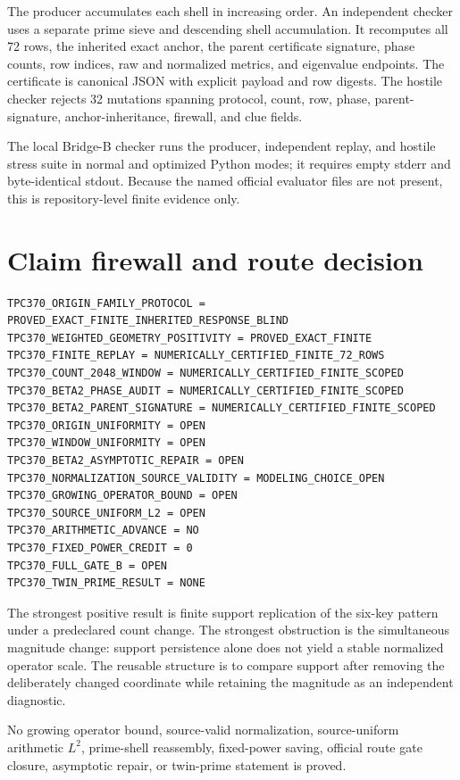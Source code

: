\documentclass[10pt]{article}
\begin{document}
The producer accumulates each shell in increasing order.  An independent
checker uses a separate prime sieve and descending shell accumulation.  It
recomputes all 72 rows, the inherited exact anchor, the parent certificate
signature, phase counts, row indices, raw and normalized metrics, and
eigenvalue endpoints.  The certificate is canonical JSON with explicit
payload and row digests.  The hostile checker rejects 32 mutations spanning
protocol, count, row, phase, parent-signature, anchor-inheritance, firewall,
and clue fields.

The local Bridge-B checker runs the producer, independent replay, and hostile
stress suite in normal and optimized Python modes; it requires empty stderr
and byte-identical stdout.  Because the named official evaluator files are
not present, this is repository-level finite evidence only.

\section{Claim firewall and route decision}

\begin{verbatim}
TPC370_ORIGIN_FAMILY_PROTOCOL = PROVED_EXACT_FINITE_INHERITED_RESPONSE_BLIND
TPC370_WEIGHTED_GEOMETRY_POSITIVITY = PROVED_EXACT_FINITE
TPC370_FINITE_REPLAY = NUMERICALLY_CERTIFIED_FINITE_72_ROWS
TPC370_COUNT_2048_WINDOW = NUMERICALLY_CERTIFIED_FINITE_SCOPED
TPC370_BETA2_PHASE_AUDIT = NUMERICALLY_CERTIFIED_FINITE_SCOPED
TPC370_BETA2_PARENT_SIGNATURE = NUMERICALLY_CERTIFIED_FINITE_SCOPED
TPC370_ORIGIN_UNIFORMITY = OPEN
TPC370_WINDOW_UNIFORMITY = OPEN
TPC370_BETA2_ASYMPTOTIC_REPAIR = OPEN
TPC370_NORMALIZATION_SOURCE_VALIDITY = MODELING_CHOICE_OPEN
TPC370_GROWING_OPERATOR_BOUND = OPEN
TPC370_SOURCE_UNIFORM_L2 = OPEN
TPC370_ARITHMETIC_ADVANCE = NO
TPC370_FIXED_POWER_CREDIT = 0
TPC370_FULL_GATE_B = OPEN
TPC370_TWIN_PRIME_RESULT = NONE
\end{verbatim}

The strongest positive result is finite support replication of the six-key
pattern under a predeclared count change.  The strongest obstruction is the
simultaneous magnitude change: support persistence alone does not yield a
stable normalized operator scale.  The reusable structure is to compare
support after removing the deliberately changed coordinate while retaining
the magnitude as an independent diagnostic.

No growing operator bound, source-valid normalization, source-uniform
arithmetic $L^2$, prime-shell reassembly, fixed-power saving, official route
gate closure, asymptotic repair, or twin-prime statement is proved.
\end{document}
